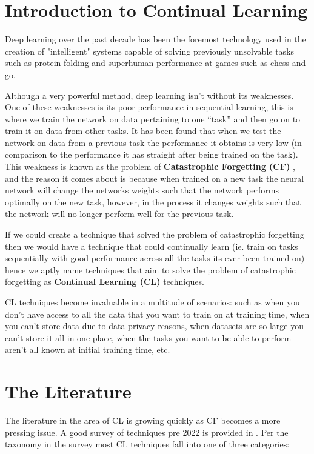 \section{Introduction to Continual Learning}
Deep learning \cite{lecun2015deep} over the past decade has been the foremost technology used in the creation of "intelligent" systems capable of solving previously unsolvable tasks such as protein folding \cite{varadi2022alphafold} and superhuman performance at games such as chess and go.

Although a very powerful method, deep learning isn't without its weaknesses. One of these weaknesses is its poor performance in sequential learning, this is where we train the network on data pertaining to one ``task'' and then go on to train it on data from other tasks. It has been found that when we test the network on data from a previous task the performance it obtains is very low (in comparison to the performance it has straight after being trained on the task). This weakness is known as the problem of \textbf{Catastrophic Forgetting (CF)} \cite{french1999catastrophic,mccloskey1989catastrophic,ratcliff1990catastrophic}, and the reason it comes about is because when trained on a new task the neural network will change the networks weights such that the network performs optimally on the new task, however, in the process it changes weights such that the network will no longer perform well for the previous task. 

If we could create a technique that solved the problem of catastrophic forgetting then we would have a technique that could continually learn (ie. train on tasks sequentially with good performance across all the tasks its ever been trained on) hence we aptly name techniques that aim to solve the problem of catastrophic forgetting as \textbf{Continual Learning (CL)} techniques.

CL techniques become invaluable in a multitude of scenarios: such as when you don't have access to all the data that you want to train on at training time, when you can't store data due to data privacy reasons, when datasets are so large you can't store it all in one place, when the tasks you want to be able to perform aren't all known at initial training time, etc. 


\section{The Literature}
The literature in the area of CL is growing quickly as CF becomes a more pressing issue. A good survey of techniques pre 2022 is provided in \cite{de2021continual}. Per the taxonomy in the survey most CL techniques fall into one of three categories: 

